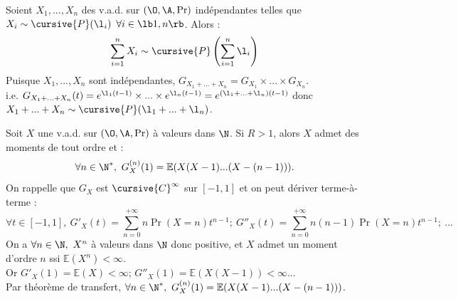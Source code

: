 \documentclass[11pt]{article}
\renewcommand*{\E}{\mathbb{E}}
\begin{document}
\vspace*{-0.8cm}

\begin{prop}{}{}
    Soient $X_1,...,X_n$ des v.a.d. sur $(\O,\A,\Pr)$ indépendantes telles que $X_i\sim\cursive{P}(\l_i)$ $\forall i \in \lb1,n\rb$. Alors :
    \begin{equation*}
        \sum_{i=1}^n X_i \sim \cursive{P}\left(\sum_{i=1}^n\l_i\right)
    \end{equation*}
    \tcblower
    Puisque $X_1,...,X_n$ sont indépendantes, $G_{X_1+...+X_n}=G_{X_1}\times...\times G_{X_n}$.\\
    i.e. $G_{X_1+...+X_n}(t) = e^{\l_1(t-1)}\times...\times e^{\l_n(t-1)} = e^{(\l_1+...+\l_n)(t-1)}$ donc $X_1+...+X_n\sim \cursive{P}(\l_1+...+\l_n)$.
\end{prop}

\vspace*{-0.8cm}

\begin{prop}{}{}
    Soit $X$ une v.a.d. sur $(\O,\A,\Pr)$ à valeurs dans $\N$. Si $R>1$, alors $X$ admet des moments de tout ordre et :
    \begin{equation*}
        \forall n \in \N^*, ~ G_X^{(n)}(1) = \E(X(X-1)...(X-(n-1))).
    \end{equation*}
    \tcblower
    On rappelle que $G_X$ est $\cursive{C}^\infty$ sur $[-1,1]$ et on peut dériver terme-à-terme :
    \begin{equation*}
        \forall t \in [-1,1], ~ G'_X(t) = \sum_{n=0}^{+\infty} n\Pr(X=n)t^{n-1}; ~ G''_X(t)=\sum_{n=0}^{+\infty}n(n-1)\Pr(X=n)t^{n-1}; ~ ...
    \end{equation*}
    On a $\forall n \in \N, ~ X^n$ à valeurs dans $\N$ donc positive, et $X$ admet un moment d'ordre $n$ ssi $\E(X^n)<\infty$.\\
    Or $G'_X(1)=\E(X)<\infty$; $G''_X(1)=\E(X(X-1))<\infty$...\\
    Par théorème de transfert, $\forall n \in \N^*, ~ G_X^{(n)}(1)=\E(X(X-1)...(X-(n-1)))$.
\end{prop}
\end{document}
